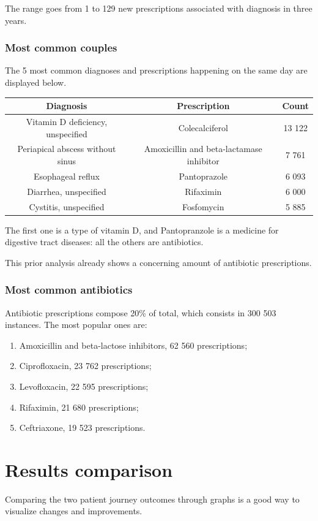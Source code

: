 The range goes from 1 to 129 new prescriptions associated with diagnosis in three years.

\subsubsection{Most common couples}
The 5 most common diagnoses and prescriptions happening on the same day are displayed below.
\begin{center}
	\small
	\begin{tabular}{c|c|c}
		Diagnosis & Prescription & Count \\
		\hline
		Vitamin D deficiency, unspecified & Colecalciferol & 13 122 \\
		\hline
		Periapical abscess without sinus & Amoxicillin and beta-lactamase inhibitor & 7 761 \\
		\hline
		Esophageal reflux & Pantoprazole & 6 093 \\
		\hline
		Diarrhea, unspecified & Rifaximin & 6 000 \\
		\hline
		Cystitis, unspecified & Fosfomycin & 5 885 \\
	\end{tabular}
\end{center}
The first one is a type of vitamin D, and Pantopranzole is a medicine for digestive tract diseases: all the others are antibiotics. 

This prior analysis already shows a concerning amount of antibiotic prescriptions. 

\subsubsection{Most common antibiotics}
Antibiotic prescriptions compose 20\% of total, which consists in 300 503 instances. The most popular ones are:
\begin{enumerate}
	\item Amoxicillin and beta-lactose inhibitors, 62 560 prescriptions;
	\item Ciprofloxacin, 23 762 prescriptions;
	\item Levofloxacin, 22 595 prescriptions;
	\item Rifaximin, 21 680 prescriptions;
	\item Ceftriaxone, 19 523 prescriptions.
\end{enumerate}

\section{Results comparison}
Comparing the two patient journey outcomes through graphs is a good way to visualize changes and improvements.

